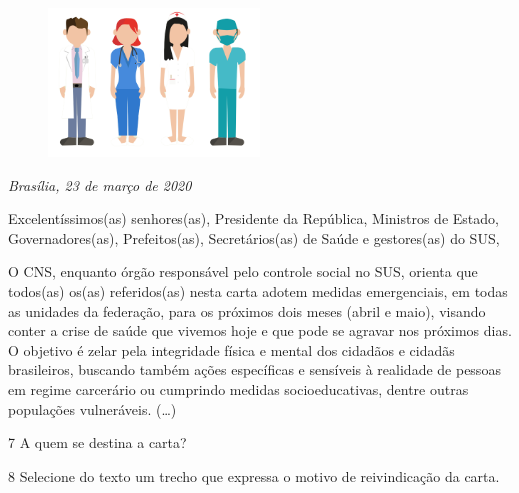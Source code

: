 \begin{myquote}

\begin{figure}[H]
\centering
\includegraphics[width=0.5\textwidth]{./imgSAEB_7_POR/media/image30.png}
\end{figure}

\emph{Brasília, 23 de março de 2020}

Excelentíssimos(as) senhores(as), Presidente da República, Ministros de
Estado, Governadores(as), Prefeitos(as), Secretários(as) de Saúde e
gestores(as) do SUS,

O CNS, enquanto órgão responsável pelo controle social no SUS, orienta
que todos(as) os(as) referidos(as) nesta carta adotem medidas
emergenciais, em todas as unidades da federação, para os próximos dois
meses (abril e maio), visando conter a crise de saúde que vivemos hoje e
que pode se agravar nos próximos dias. O objetivo é zelar pela
integridade física e mental dos cidadãos e cidadãs brasileiros, buscando
também ações específicas e sensíveis à realidade de pessoas em regime
carcerário ou cumprindo medidas socioeducativas, dentre outras
populações vulneráveis. (\ldots{})


\end{myquote} 

\num{7} A quem se destina a carta?


\num{8} Selecione do texto um trecho que expressa o motivo de reivindicação da carta.

